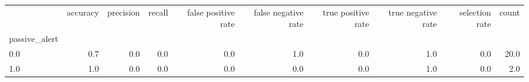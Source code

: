 \begin{tabular}{lrrrrrrrrr}
\toprule
{} &  accuracy &  precision &  recall &  false positive rate &  false negative rate &  true positive rate &  true negative rate &  selection rate &  count \\
passive\_alert &           &            &         &                      &                      &                     &                     &                 &        \\
\midrule
0.0           &       0.7 &        0.0 &     0.0 &                  0.0 &                  1.0 &                 0.0 &                 1.0 &             0.0 &   20.0 \\
1.0           &       1.0 &        0.0 &     0.0 &                  0.0 &                  0.0 &                 0.0 &                 1.0 &             0.0 &    2.0 \\
\bottomrule
\end{tabular}
